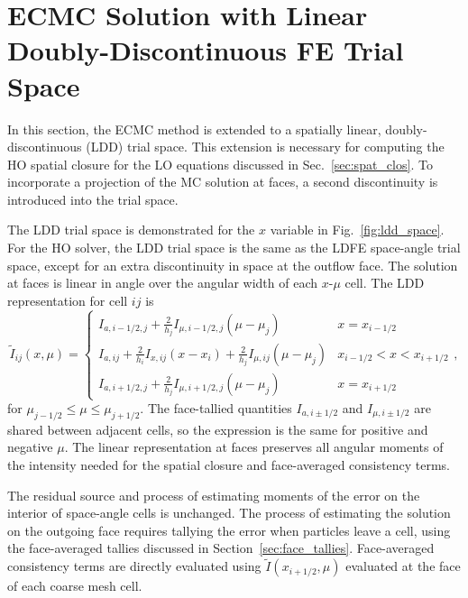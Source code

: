 \section{ECMC Solution with Linear Doubly-Discontinuous FE Trial Space}
\label{sec:ldd_mc}

In this section, the ECMC method is extended to a spatially linear, doubly-discontinuous
(LDD) trial space.   
This extension is necessary for computing the HO spatial closure for
the LO equations discussed in Sec.~\ref{sec:spat_clos}.  To incorporate a projection of
the MC solution at faces, a second discontinuity is
introduced into the trial space. 

 The LDD trial space is demonstrated for the $x$ variable in
Fig.~\ref{fig:ldd_space}.   For the HO solver, the LDD trial space is the same as the LDFE
space-angle trial space, except for an extra discontinuity in space at the outflow face.
The solution at faces is linear in angle over the angular width of each $x$-$\mu$ cell.
The LDD representation for cell $ij$ is
\begin{equation}\label{eq:ldd_I}
    \tilde{I}_{ij}(x,\mu) = \left \{ \begin{array}{cl}
        I_{a,i-1/2,j}+\frac{2}{h_j}I_{\mu,i-1/2,j}\left(\mu-\mu_j\right) &
        x=x_{i-1/2} \\
I_{a,ij} + \frac{2}{h_i}I_{x,ij}\left(x-x_i\right) +
\frac{2}{h_j}I_{\mu,ij}\left(\mu-\mu_j\right) & x_{i-1/2} < x < x_{i+1/2}  \\
    I_{a,i+1/2,j}+\frac{2}{h_j}I_{\mu,i+1/2,j}\left(\mu-\mu_j\right) &   x=x_{i+1/2}  
\end{array} \right.,
\end{equation}
for $\mu_{j-1/2} \leq \mu \leq \mu_{j+1/2}$.  The face-tallied quantities $I_{a,i\pm1/2}$ and $I_{\mu,i\pm1/2}$ are shared
between adjacent cells, so the expression is the same for positive and negative $\mu$.
The linear representation at faces preserves all angular moments of the intensity needed for the spatial closure and
face-averaged consistency terms.  

The residual source and process of estimating moments of
the error on the interior of space-angle cells is unchanged.  The process of estimating
the solution on the outgoing face requires tallying the error when particles leave a
cell, using the face-averaged tallies discussed in Section~\ref{sec:face_tallies}.  
Face-averaged consistency terms are directly evaluated using $\tilde
I(x_{i+1/2},\mu)$ evaluated at the face of each coarse mesh cell.   

